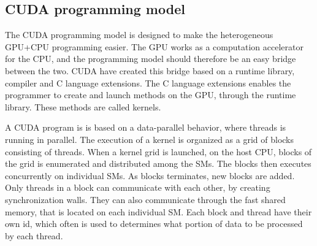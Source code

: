 
\subsection{CUDA programming model} %
\label{ssub:cuda_programming_model}

The CUDA programming model is designed to make the heterogeneous GPU+CPU programming easier. The GPU works as a computation accelerator for the CPU, and the programming model should therefore be an easy bridge between the two. CUDA have created this bridge based on a runtime library, compiler and C language extensions. The C language extensions enables the programmer to create and launch methods on the GPU, through the runtime library. These methods are called kernels.

A CUDA program is is based on a data-parallel behavior, where threads is running in parallel. The execution of a kernel is organized as a grid of blocks consisting of threads. When a kernel grid is launched, on the host CPU, blocks of the grid is enumerated and distributed among the SMs. The blocks then executes concurrently on individual SMs. As blocks terminates, new blocks are added. Only threads in a block can communicate with each other, by creating synchronization walls. They can also communicate through the fast shared memory, that is located on each individual SM. Each block and thread have their own id, which often is used to determines what portion of data to be processed by each thread.





\cleardoublepage

